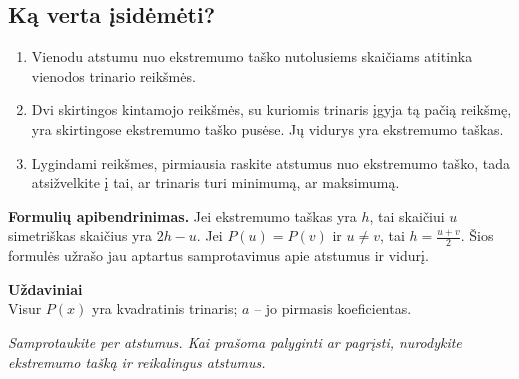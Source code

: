\documentclass[11pt,a4paper]{scrartcl}
\newcommand{\pagetitle}[2]{\begin{center}{\Large\bfseries #1}\\[3pt]{\small #2}\end{center}\vspace{3mm}}
\begin{document}
\subsection*{Ką verta įsidėmėti?}
\begin{enumerate}
\item Vienodu atstumu nuo ekstremumo taško nutolusiems skaičiams atitinka vienodos trinario reikšmės.
\item Dvi skirtingos kintamojo reikšmės, su kuriomis trinaris įgyja tą pačią reikšmę, yra skirtingose ekstremumo taško pusėse. Jų vidurys yra ekstremumo taškas.
\item Lygindami reikšmes, pirmiausia raskite atstumus nuo ekstremumo taško, tada atsižvelkite į tai, ar trinaris turi minimumą, ar maksimumą.
\end{enumerate}
\textbf{Formulių apibendrinimas.} Jei ekstremumo taškas yra $h$, tai skaičiui $u$ simetriškas skaičius yra $2h-u$. Jei $P(u)=P(v)$ ir $u\ne v$, tai $h=\frac{u+v}{2}$. Šios formulės užrašo jau aptartus samprotavimus apie atstumus ir vidurį.


\newpage
\pagetitle{Uždaviniai}{Visur $P(x)$ yra kvadratinis trinaris; $a$ -- jo pirmasis koeficientas.}
\textit{Samprotaukite per atstumus. Kai prašoma palyginti ar pagrįsti, nurodykite ekstremumo tašką ir reikalingus atstumus.}
\end{document}
